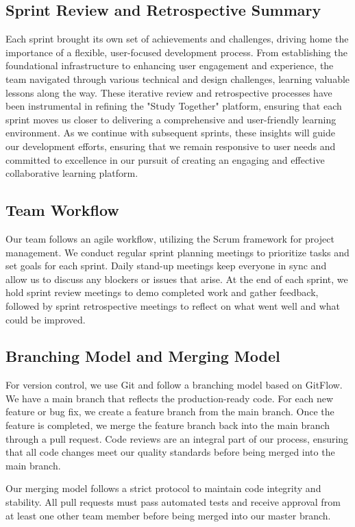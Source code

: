 \subsection{Sprint Review and Retrospective Summary}\label{sprint_review_retrospective_summary}
Each sprint brought its own set of achievements and challenges, driving home the importance of a flexible, user-focused development process. From establishing the foundational infrastructure to enhancing user engagement and experience, the team navigated through various technical and design challenges, learning valuable lessons along the way. These iterative review and retrospective processes have been instrumental in refining the "Study Together" platform, ensuring that each sprint moves us closer to delivering a comprehensive and user-friendly learning environment. As we continue with subsequent sprints, these insights will guide our development efforts, ensuring that we remain responsive to user needs and committed to excellence in our pursuit of creating an engaging and effective collaborative learning platform.


\subsection{Team Workflow}\label{team_workflow}
Our team follows an agile workflow, utilizing the Scrum framework for project management. We conduct regular sprint planning meetings to prioritize tasks and set goals for each sprint. Daily stand-up meetings keep everyone in sync and allow us to discuss any blockers or issues that arise. At the end of each sprint, we hold sprint review meetings to demo completed work and gather feedback, followed by sprint retrospective meetings to reflect on what went well and what could be improved.

\subsection{Branching Model and Merging Model}\label{bm_mm}
For version control, we use Git and follow a branching model based on GitFlow. We have a main branch that reflects the production-ready code. For each new feature or bug fix, we create a feature branch from the main branch. Once the feature is completed, we merge the feature branch back into the main branch through a pull request. Code reviews are an integral part of our process, ensuring that all code changes meet our quality standards before being merged into the main branch.

Our merging model follows a strict protocol to maintain code integrity and stability. All pull requests must pass automated tests and receive approval from at least one other team member before being merged into our master branch.
